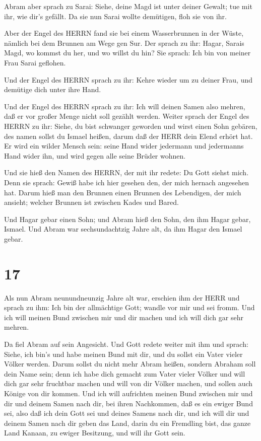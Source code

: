  Abram aber sprach zu Sarai: Siehe, deine Magd ist unter
deiner Gewalt; tue mit ihr, wie dir's gefällt. Da sie nun Sarai wollte
demütigen, floh sie von ihr.

 Aber der Engel des HERRN fand sie bei einem Wasserbrunnen
in der Wüste, nämlich bei dem Brunnen am Wege gen Sur.  Der
sprach zu ihr: Hagar, Sarais Magd, wo kommst du her, und wo willst du
hin? Sie sprach: Ich bin von meiner Frau Sarai geflohen.

 Und der Engel des HERRN sprach zu ihr: Kehre wieder um zu
deiner Frau, und demütige dich unter ihre Hand.

 Und der Engel des HERRN sprach zu ihr: Ich will deinen
Samen also mehren, daß er vor großer Menge nicht soll gezählt werden.
 Weiter sprach der Engel des HERRN zu ihr: Siehe, du bist
schwanger geworden und wirst einen Sohn gebären, des namen sollst du
Ismael heißen, darum daß der HERR dein Elend erhört hat. 
Er wird ein wilder Mensch sein: seine Hand wider jedermann und
jedermanns Hand wider ihn, und wird gegen alle seine Brüder wohnen.

 Und sie hieß den Namen des HERRN, der mit ihr redete: Du
Gott siehst mich. Denn sie sprach: Gewiß habe ich hier gesehen den, der
mich hernach angesehen hat.  Darum hieß man den Brunnen
einen Brunnen des Lebendigen, der mich ansieht; welcher Brunnen ist
zwischen Kades und Bared.

 Und Hagar gebar einen Sohn; und Abram hieß den Sohn, den
ihm Hagar gebar, Ismael.  Und Abram war sechsundachtzig
Jahre alt, da ihm Hagar den Ismael gebar.

\hypertarget{section-16}{%
\section{17}\label{section-16}}

 Als nun Abram neunundneunzig Jahre alt war, erschien ihm
der HERR und sprach zu ihm: Ich bin der allmächtige Gott; wandle vor mir
und sei fromm.  Und ich will meinen Bund zwischen mir und
dir machen und ich will dich gar sehr mehren.

 Da fiel Abram auf sein Angesicht. Und Gott redete weiter
mit ihm und sprach:  Siehe, ich bin's und habe meinen Bund
mit dir, und du sollst ein Vater vieler Völker werden. 
Darum sollst du nicht mehr Abram heißen, sondern Abraham soll dein Name
sein; denn ich habe dich gemacht zum Vater vieler Völker 
und will dich gar sehr fruchtbar machen und will von dir Völker machen,
und sollen auch Könige von dir kommen.  Und ich will
aufrichten meinen Bund zwischen mir und dir und deinem Samen nach dir,
bei ihren Nachkommen, daß es ein ewiger Bund sei, also daß ich dein Gott
sei und deines Samens nach dir,  und ich will dir und deinem
Samen nach dir geben das Land, darin du ein Fremdling bist, das ganze
Land Kanaan, zu ewiger Besitzung, und will ihr Gott sein.

